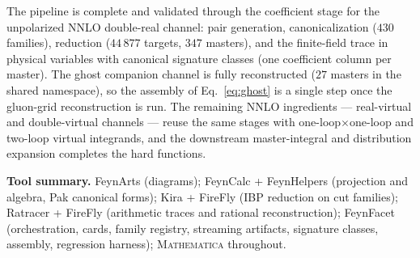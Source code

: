 \documentclass[11pt]{article}
\begin{document}
The pipeline is complete and validated through the coefficient stage
for the unpolarized NNLO double-real channel: pair generation,
canonicalization ($430$ families), reduction ($44\,877$ targets,
$347$ masters), and the finite-field trace in physical variables with
canonical signature classes (one coefficient column per master).  The
ghost companion channel is fully reconstructed ($27$ masters in the
shared namespace), so the assembly of Eq.~\eqref{eq:ghost} is a single
step once the gluon-grid reconstruction is run.  The remaining NNLO
ingredients --- real-virtual and double-virtual channels --- reuse the
same stages with one-loop$\times$one-loop and two-loop virtual
integrands, and the downstream master-integral and distribution
expansion completes the hard functions.

\vspace{2ex}
\noindent\textbf{Tool summary.}
\textsf{FeynArts} (diagrams);
\textsf{FeynCalc} + \textsf{FeynHelpers} (projection and algebra, Pak
canonical forms);
\textsf{Kira} + \textsf{FireFly} (IBP reduction on cut families);
\textsf{Ratracer} + \textsf{FireFly} (arithmetic traces and rational
reconstruction);
\textsf{FeynFacet} (orchestration, cards, family registry, streaming
artifacts, signature classes, assembly, regression harness);
\textsc{Mathematica} throughout.
\end{document}
